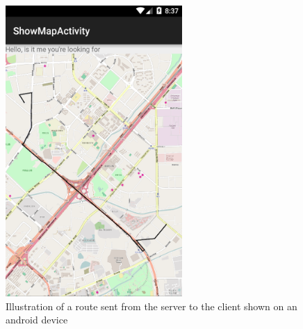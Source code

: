 \begin{figure}[H]
  \centering
    \includegraphics[width=0.6\textwidth]{figures/routeOnMap.png}
    \caption{Illustration of a route sent from the server to the client shown on an android device}
    \label{fig:routeonmap}
\end{figure}
